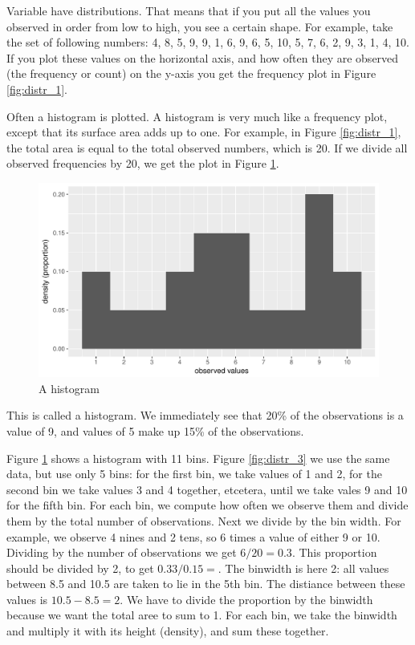 \documentclass[]{report}\usepackage[]{graphicx}\usepackage[]{color}
\makeatletter
\def\maxwidth{ %
  \ifdim\Gin@nat@width>\linewidth
    \linewidth
  \else
    \Gin@nat@width
  \fi
}
\newenvironment{knitrout}{}{} %
\makeatother
\begin{document}
Variable have distributions. That means that if you put all the values you observed in order from low to high, you see a certain shape. For example, take the set of following numbers: 4, 8, 5, 9, 9, 1, 6, 9, 6, 5, 10, 5, 7, 6, 2, 9, 3, 1, 4, 10. If you plot these values on the horizontal axis, and how often they are observed (the frequency or count) on the y-axis you get the frequency plot in Figure \ref{fig:distr_1}. 

Often a histogram is plotted. A histogram is very much like a frequency plot, except that its surface area adds up to one. For example, in Figure \ref{fig:distr_1}, the total area is equal to the total observed numbers, which is 20. If we divide all observed frequencies by 20, we get the plot in Figure \ref{fig:distr_2}.

\begin{knitrout}
\color{fgcolor}\begin{figure}

{\centering \includegraphics[width=\maxwidth]{figure/distr_2-1} 

}

\caption[A histogram]{A histogram}\label{fig:distr_2}
\end{figure}


\end{knitrout}

This is called a histogram. We immediately see that 20\% of the observations is a value of 9, and values of 5 make up 15\% of the observations. 


Figure \ref{fig:distr_2} shows a histogram with 11 bins. Figure \ref{fig:distr_3} we use the same data, but use only 5 bins: for the first bin, we take values of 1 and 2, for the second bin we take values 3 and 4 together, etcetera, until we take vales 9 and 10 for the fifth bin. For each bin, we compute how often we observe them and divide them by the total number of observations. Next we divide by the bin width. For example, we observe 4 nines and 2 tens, so 6 times a value of either 9 or 10. Dividing by the number of observations we get $6/20=0.3$. This proportion should be divided by 2, to get $0.33/0.15=$. The binwidth is here 2: all values between 8.5 and 10.5 are taken to lie in the 5th bin. The distiance between these values is $10.5-8.5=2$. We have to divide the proportion by the binwidth because we want the total aree to sum to 1. For each bin, we take the binwidth and multiply it with its height (density), and sum these together. 
\end{document}
